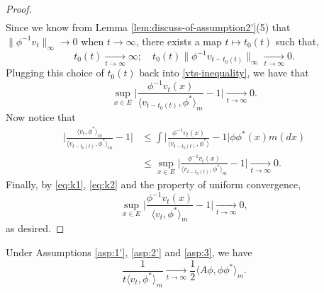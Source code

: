 \begin{proof}
\begin{equation}
\begin{split}
\end{split}\end{equation}
	Since we know from
	Lemma \ref{lem:discuss-of-assumption2'}(5)
	that $\| \phi^{-1}v_t\|_\infty\to 0$ when $t\to\infty$, there exists a map $t\mapsto t_0(t)$ such that,
\[
	t_0(t)
	\xrightarrow[t\to\infty]{} \infty;
	\quad t_0(t)\| \phi^{-1}v_{t-t_0(t)}\|_\infty
	\xrightarrow[t\to\infty]{} 0.
\]
	Plugging this choice of $t_0(t)$ back into \eqref{vts-inequality}, we have that
\begin{equation}\label{eq:k1}
	\sup_{x\in E}\Big|\frac{\phi^{-1}v_t(x)}{\langle v_{t-t_0(t)},\phi^* \rangle_m}-1 \Big|
	\xrightarrow[t\to\infty]{} 0.
\end{equation}
	Now notice that
\begin{equation}\label{eq:k2}\begin{split}
	\Big |\frac {\langle v_t, \phi^*\rangle_m} {\langle v_{t-t_0(t)} , \phi^*\rangle_m} - 1 \Big |
	&\leq \int \Big | \frac{\phi^{-1}v_t(x)}{\langle v_{t-t_0(t)} , \phi^*\rangle} - 1 \Big| \phi \phi^*(x) m(dx)\\
	&\leq \sup_{x\in E}\Big|\frac{\phi^{-1}v_t(x)}{\langle v_{t-t_0(t)},\phi^* \rangle_m}-1 \Big|
	\xrightarrow[t\to\infty]{} 0.
\end{split}\end{equation}
	Finally, by \eqref{eq:k1}, \eqref{eq:k2} and the property of uniform convergence,
\[
	\sup_{x\in E}\Big|\frac{\phi^{-1}v_t(x)}{\langle v_{t},\phi^* \rangle_m}-1 \Big|
	\xrightarrow[t\to\infty]{} 0,
\]
	as desired.
\end{proof}
\begin{lem}\label{lem:Kolmogorov-2}
	Under Assumptions \ref{asp:1'}, \ref{asp:2'} and \ref{asp:3}, we have
\[
	\frac{1}{t\langle v_t,\phi^*\rangle_m}
	\xrightarrow[t\to\infty]{} \frac{1}{2}\langle  A\phi,\phi\phi^*\rangle_m.
\]
\end{lem}
